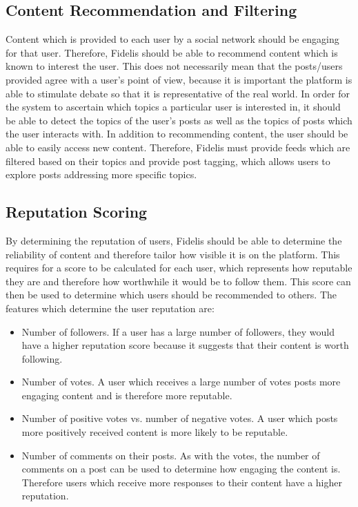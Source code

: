 \subsection{Content Recommendation and Filtering}
Content which is provided to each user by a social network should be engaging for that user. Therefore, Fidelis should be able to recommend content which is known to interest the user. This does not necessarily mean that the posts/users provided agree with a user's point of view, because it is important the platform is able to stimulate debate so that it is representative of the real world. In order for the system to ascertain which topics a particular user is interested in, it should be able to detect the topics of the user's posts as well as the topics of posts which the user interacts with. In addition to recommending content, the user should be able to easily access new content. Therefore, Fidelis must provide feeds which are filtered based on their topics and provide post tagging, which allows users to explore posts addressing more specific topics.

\subsection{Reputation Scoring}
By determining the reputation of users, Fidelis should be able to determine the reliability of content and therefore tailor how visible it is on the platform. This requires for a score to be calculated for each user, which represents how reputable they are and therefore how worthwhile it would be to follow them. This score can then be used to determine which users should be recommended to others. The features which determine the user reputation are:

\begin{itemize}
\item Number of followers. If a user has a large number of followers, they would have a higher reputation score because it suggests that their content is worth following.
\item Number of votes. A user which receives a large number of votes posts more engaging content and is therefore more reputable.
\item Number of positive votes vs. number of negative votes. A user which posts more positively received content is more likely to be reputable.
\item Number of comments on their posts. As with the votes, the number of comments on a post can be used to determine how engaging the content is. Therefore users which receive more responses to their content have a higher reputation.
\end{itemize}

